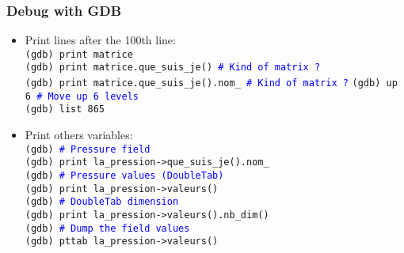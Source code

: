 \documentclass[10pt, hyperref={unicode=true,pdfusetitle, bookmarks=true,bookmarksnumbered=false,bookmarksopen=false, breaklinks=false,pdfborder={0 0 1},backref=true,colorlinks=true,linkcolor=darkblue,pageanchor, urlcolor=darkblue}]{beamer}
\begin{document}
\begin{frame}
\frametitle{Debug with GDB}
\begin{block}{}

\begin{itemize}
\item Print lines after the 100th line:\\
\texttt{(gdb) print matrice}\\
\texttt{(gdb) print matrice.que\_suis\_je() \textcolor{blue}{\# Kind of matrix ?}}\\
\texttt{(gdb) print matrice.que\_suis\_je().nom\_ \textcolor{blue}{\# Kind of matrix ?}}
\texttt{(gdb) up 6 \textcolor{blue}{\# Move up 6 levels}}\\
\texttt{(gdb) list 865}

\item Print others variables:\\
\texttt{(gdb) \textcolor{blue}{\# Pressure field}}\\
\texttt{(gdb) print la\_pression->que\_suis\_je().nom\_}\\
\texttt{(gdb) \textcolor{blue}{\# Pressure values (DoubleTab)}}\\
\texttt{(gdb) print la\_pression->valeurs()}\\
\texttt{(gdb) \textcolor{blue}{\# DoubleTab dimension}}\\
\texttt{(gdb) print la\_pression->valeurs().nb\_dim()}\\
\texttt{(gdb) \textcolor{blue}{\# Dump the field values}}\\
\texttt{(gdb) pttab la\_pression->valeurs()}
\end{itemize}

\end{block}
\end{frame}
\end{document}

